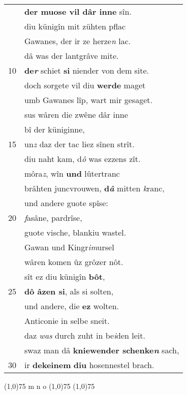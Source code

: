 \documentclass[8pt,a4paper,notitlepage]{article}
\begin{document}
\begin{table}[ht]
\begin{minipage}[t]{0.5\linewidth}
\begin{tabular}{rl}
 & \textbf{der muose vil dâr inne} sîn.\\ 
 & diu künigîn mit zühten pflac\\ 
 & Gawanes, der ir ze herze\textit{n} lac.\\ 
 & dâ was der lantgrâve mite.\\ 
10 & \textbf{de\textit{r}} schiet \textbf{si} niender von dem site.\\ 
 & doch sorgete vil diu \textbf{werde} maget\\ 
 & umb Gawanes lîp, wart mir gesaget.\\ 
 & sus wâren die zwêne dâr inne\\ 
 & bî der küniginne,\\ 
15 & un\textit{z} daz der tac liez sînen strît.\\ 
 & diu naht kam, d\textit{ô} was ezzens zît.\\ 
 & môra\textit{z}, wîn \textbf{und} lûtertranc\\ 
 & brâhten juncvrouwen, \textbf{d\textit{â}} mitten \textit{k}ranc,\\ 
 & und andere guote spîse:\\ 
20 & \textit{f}asâne, pardrîse,\\ 
 & guote vische, blankiu wastel.\\ 
 & Gawan und Kingr\textit{im}ursel\\ 
 & wâren komen ûz grôzer nôt.\\ 
 & sît ez diu künigîn \textbf{bôt},\\ 
25 & \textbf{dô âzen si}, als si solten,\\ 
 & und andere, die \textbf{ez} wolten.\\ 
 & Anticonie in selbe sneit.\\ 
 & daz \textit{was} durch zuht in be\textit{i}den leit.\\ 
 & swaz man dâ \textbf{kniewender schenke\textit{n}} sach,\\ 
30 & ir \textbf{dekeinem} \textbf{diu} hosennestel brach.\\ 
\end{tabular}
\scriptsize
\line(1,0){75} \newline
m n o \newline
\line(1,0){75} \newline
\newline
\line(1,0){75} \newline

\end{minipage}
\end{table}
\end{document}
